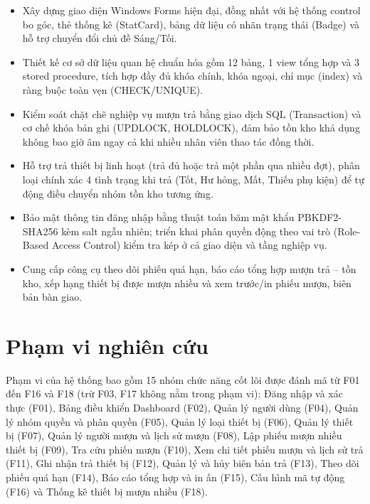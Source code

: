 \begin{itemize}

\item Xây dựng giao diện Windows Forms hiện đại, đồng nhất với hệ thống control bo góc, thẻ thống kê (StatCard), bảng dữ liệu có nhãn trạng thái (Badge) và hỗ trợ chuyển đổi chủ đề Sáng/Tối.

\item Thiết kế cơ sở dữ liệu quan hệ chuẩn hóa gồm 12 bảng, 1 view tổng hợp và 3 stored procedure, tích hợp đầy đủ khóa chính, khóa ngoại, chỉ mục (index) và ràng buộc toàn vẹn (CHECK/UNIQUE).

\item Kiểm soát chặt chẽ nghiệp vụ mượn trả bằng giao dịch SQL (Transaction) và cơ chế khóa bản ghi (UPDLOCK, HOLDLOCK), đảm bảo tồn kho khả dụng không bao giờ âm ngay cả khi nhiều nhân viên thao tác đồng thời.

\item Hỗ trợ trả thiết bị linh hoạt (trả đủ hoặc trả một phần qua nhiều đợt), phân loại chính xác 4 tình trạng khi trả (Tốt, Hư hỏng, Mất, Thiếu phụ kiện) để tự động điều chuyển nhóm tồn kho tương ứng.

\item Bảo mật thông tin đăng nhập bằng thuật toán băm mật khẩu PBKDF2-SHA256 kèm salt ngẫu nhiên; triển khai phân quyền động theo vai trò (Role-Based Access Control) kiểm tra kép ở cả giao diện và tầng nghiệp vụ.

\item Cung cấp công cụ theo dõi phiếu quá hạn, báo cáo tổng hợp mượn trả – tồn kho, xếp hạng thiết bị được mượn nhiều và xem trước/in phiếu mượn, biên bản bàn giao.

\end{itemize}

\section{Phạm vi nghiên cứu}

Phạm vi của hệ thống bao gồm 15 nhóm chức năng cốt lõi được đánh mã từ F01 đến F16 và F18 (trừ F03, F17 không nằm trong phạm vi): Đăng nhập và xác thực (F01), Bảng điều khiển Dashboard (F02), Quản lý người dùng (F04), Quản lý nhóm quyền và phân quyền (F05), Quản lý loại thiết bị (F06), Quản lý thiết bị (F07), Quản lý người mượn và lịch sử mượn (F08), Lập phiếu mượn nhiều thiết bị (F09), Tra cứu phiếu mượn (F10), Xem chi tiết phiếu mượn và lịch sử trả (F11), Ghi nhận trả thiết bị (F12), Quản lý và hủy biên bản trả (F13), Theo dõi phiếu quá hạn (F14), Báo cáo tổng hợp và in ấn (F15), Cấu hình mã tự động (F16) và Thống kê thiết bị mượn nhiều (F18).


